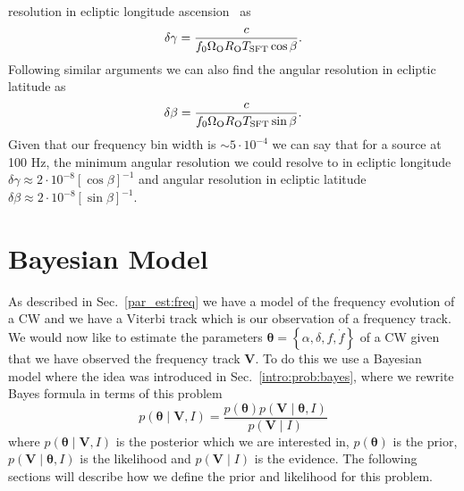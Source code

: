 resolution in ecliptic longitude ascension~ as
%
\begin{equation}
    \delta \gamma = \frac{c}{f_0 \Omega_{\rm{O}} R_{\rm{O}} T_{\rm{SFT}} \cos \beta}.
\end{equation}
%
 Following similar
arguments we can also find the angular resolution in ecliptic latitude as
%
\begin{equation}
    \delta \beta = \frac{c}{f_0 \Omega_{\rm{O}} R_{\rm{O}} T_{\rm{SFT}} \sin \beta}.
\end{equation}
%
 Given that our frequency bin width
is $\sim 5 \cdot 10^{-4}$ we can say that for a source at 100 Hz, the minimum
angular resolution we could resolve to in ecliptic longitude $\delta \gamma
\approx 2 \cdot 10^{-8} [\cos{\beta}]^{-1}$ and angular resolution in ecliptic
latitude $\delta \beta \approx 2 \cdot 10^{-8} [\sin{\beta}]^{-1}$.~

%
%
\section{\label{par_est:bayes}Bayesian Model}
%
%

As described in Sec.~\ref{par_est:freq} we have a model of the frequency evolution of a \gls{CW} and we have a Viterbi track which is our observation of a frequency track.
We would now like to estimate the parameters $\bm{\theta} = \left\{\alpha, \delta, f, \dot{f} \right\}$ of a \gls{CW} given that we have observed the frequency track $\bm{V}$.
To do this we use a Bayesian model where the idea was introduced in Sec.~\ref{intro:prob:bayes}, where we rewrite Bayes formula in terms of this problem
\begin{equation}
    \label{par_est:bayes:eqn}
    p(\bm{\theta} \mid \bm{V}, I) = \frac{p(\bm{\theta}) p(\bm{V} \mid \bm{\theta}, I)}{p(\bm{V} \mid I)}
\end{equation}
where $p(\bm{\theta} \mid \bm{V}, I)$ is the posterior which we are interested in, $p(\bm{\theta})$ is the prior, $p(\bm{V} \mid \bm{\theta}, I)$ is the likelihood and $p(\bm{V} \mid I)$ is the evidence.
The following sections will describe how we define the prior and likelihood for this problem.

